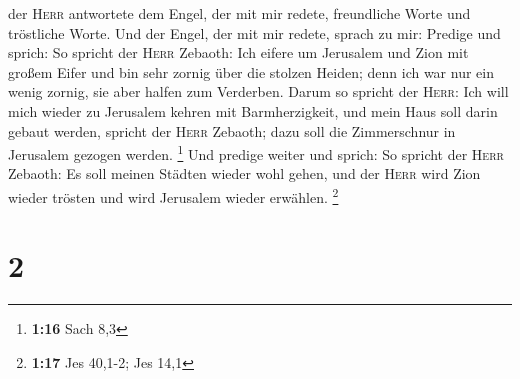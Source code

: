 der \textsc{Herr} antwortete dem Engel, der mit mir redete, freundliche
Worte und tröstliche Worte.  Und der Engel, der mit mir
redete, sprach zu mir: Predige und sprich: So spricht der \textsc{Herr}
Zebaoth: Ich eifere um Jerusalem und Zion mit großem Eifer
 und bin sehr zornig über die stolzen Heiden; denn ich
war nur ein wenig zornig, sie aber halfen zum Verderben. 
Darum so spricht der \textsc{Herr}: Ich will mich wieder zu Jerusalem
kehren mit Barmherzigkeit, und mein Haus soll darin gebaut werden,
spricht der \textsc{Herr} Zebaoth; dazu soll die Zimmerschnur in
Jerusalem gezogen werden. \footnote{\textbf{1:16} Sach 8,3}
 Und predige weiter und sprich: So spricht der
\textsc{Herr} Zebaoth: Es soll meinen Städten wieder wohl gehen, und der
\textsc{Herr} wird Zion wieder trösten und wird Jerusalem wieder
erwählen. \footnote{\textbf{1:17} Jes 40,1-2; Jes 14,1}

\hypertarget{section-1}{%
\section{2}\label{section-1}}

